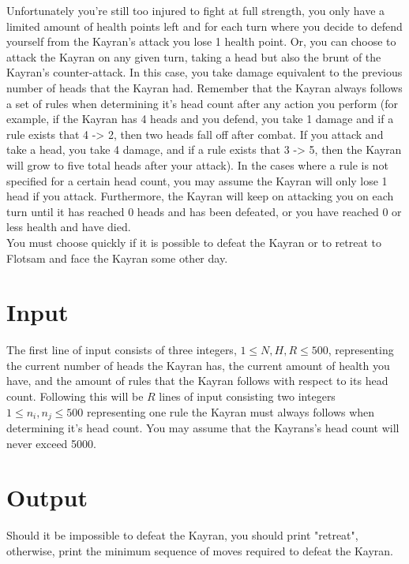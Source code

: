 \noindent Unfortunately you're still too injured to fight at full strength, you only have a limited amount of health points left 
and for each turn where you decide to defend yourself from the Kayran's attack you lose 1 health point. Or, you can choose to
attack the Kayran on any given turn, taking a head but also the brunt of the Kayran's counter-attack. In this case, you take damage 
equivalent to the previous number of heads that the Kayran had. Remember that the Kayran always follows a set of rules when determining it's head
count after any action you perform (for example, if the Kayran has 4 heads and you defend, you take 1 damage and if a rule exists that 4 -> 2, 
then two heads fall off after combat. If you attack and take a head, you take 4 damage, and if a rule exists that 3 -> 5, then the 
Kayran will grow to five total heads after your attack). In the cases where a rule is not specified for a certain head count, you may assume the 
Kayran will only lose 1 head if you attack. Furthermore, the Kayran will keep on attacking you on each turn until it has reached 0 heads and 
has been defeated, or you have reached 0 or less health and have died. \\

\noindent You must choose quickly if it is possible to defeat the Kayran or to retreat to Flotsam and face the Kayran
some other day.\\

\section*{Input}

The first line of input consists of three integers, $1 \leq N, H, R \leq 500$, representing the current number of heads the
Kayran has, the current amount of health you have, and the amount of rules that the Kayran follows with respect to its
head count. Following this will be $R$ lines of input consisting two integers $1 \leq n_i , n_j \leq 500$ representing one
rule the Kayran must always follows when determining it's head count. You may assume that the Kayrans's head count will never
exceed 5000. \\

\section*{Output}
Should it be impossible to defeat the Kayran, you should print "retreat", otherwise, print the minimum sequence of 
moves required to defeat the Kayran. \\
